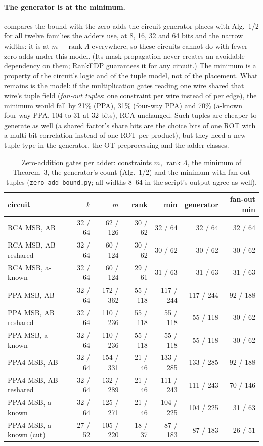 \paragraph{The generator is at the minimum.}  compares the bound with the zero-adds the circuit
generator places with Alg.~1/2 for all twelve families the adders use, at 8, 16, 32 and 64 bits and the narrow widths:
it is at $m - \operatorname{rank}\Lambda$ everywhere, so these circuits cannot do with fewer zero-adds under
this model. (Its mask propagation never creates an avoidable dependency on them; RankFDP guarantees it for any
circuit.) The minimum is a property of the circuit's logic and of the tuple model, not of the placement. What remains
is the model: if the multiplication gates reading one wire shared that wire's tuple field (\emph{fan-out tuples}: one
constraint per wire instead of per edge), the minimum would fall by 21\% (PPA), 31\% (four-way PPA) and 70\% (a-known
four-way PPA, 104 to 31 at 32 bits), RCA unchanged. Such tuples are cheaper to generate as well (a shared factor's
share bits are the choice bits of one ROT with a multi-bit correlation instead of one ROT per product), but they need
a new tuple type in the generator, the OT preprocessing and the adder classes.

\begin{table}[t]
\centering\small
\begin{tabular}{@{}lrrrrrr@{}}
\toprule
circuit & $k$ & $m$ & rank & min & generator & fan-out min\\
\midrule
RCA MSB, AB & 32 / 64 & 62 / 126 & 30 / 62 & 32 / 64 & 32 / 64 & 32 / 64\\
RCA MSB, AB reshared & 32 / 64 & 60 / 124 & 30 / 62 & 30 / 62 & 30 / 62 & 30 / 62\\
RCA MSB, a-known & 32 / 64 & 60 / 124 & 29 / 61 & 31 / 63 & 31 / 63 & 31 / 63\\
PPA MSB, AB & 32 / 64 & 172 / 362 & 55 / 118 & 117 / 244 & 117 / 244 & 92 / 188\\
PPA MSB, AB reshared & 32 / 64 & 110 / 236 & 55 / 118 & 55 / 118 & 55 / 118 & 30 / 62\\
PPA MSB, a-known & 32 / 64 & 110 / 236 & 55 / 118 & 55 / 118 & 55 / 118 & 30 / 62\\
PPA4 MSB, AB & 32 / 64 & 154 / 331 & 21 / 46 & 133 / 285 & 133 / 285 & 92 / 188\\
PPA4 MSB, AB reshared & 32 / 64 & 132 / 289 & 21 / 46 & 111 / 243 & 111 / 243 & 70 / 146\\
PPA4 MSB, a-known & 32 / 64 & 125 / 271 & 21 / 46 & 104 / 225 & 104 / 225 & 31 / 63\\
PPA4 MSB, a-known (cut) & 27 / 52 & 105 / 220 & 18 / 37 & 87 / 183 & 87 / 183 & 26 / 51\\
\bottomrule
\end{tabular}
\caption{Zero-addition gates per adder: constraints $m$, $\operatorname{rank}\Lambda$, the minimum of Theorem~3, the
generator's count (Alg.~1/2) and the minimum with fan-out tuples (\texttt{zero\_add\_bound.py}; all widths 8--64 in
the script's output agree as well).}
\label{tab:zeroadd}
\end{table}
